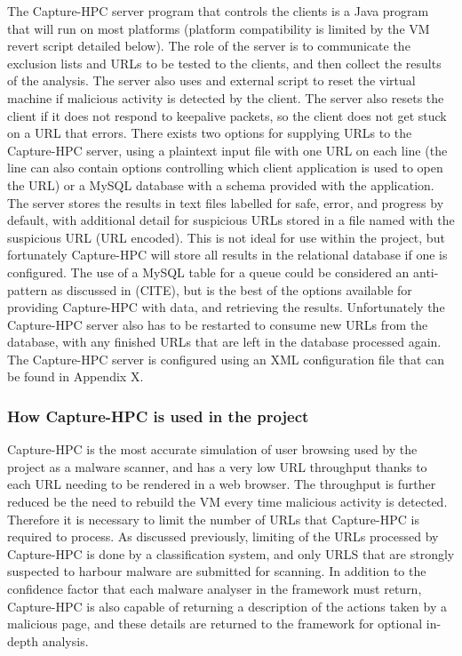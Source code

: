 The Capture-HPC server program that controls the clients is a Java program that
will run on most platforms (platform compatibility is limited by the VM revert
script detailed below). The role of the server is to communicate the exclusion
lists and URLs to be tested to the clients, and then collect the results of the
analysis. The server also uses and external script to reset the virtual machine
if malicious activity is detected by the client. The server also resets the
client if it does not respond to keepalive packets, so the client does not get
stuck on a URL that errors. There exists two options for supplying URLs to the
Capture-HPC server, using a plaintext input file with one URL on each line (the
line can also contain options controlling which client application is used to
open the URL) or a MySQL database with a schema provided with the application.
The server stores the results in text files labelled for safe, error, and
progress by default, with additional detail for suspicious URLs stored in a file
named with the suspicious URL (URL encoded). This is not ideal for use within
the project, but fortunately Capture-HPC will store all results in the
relational database if one is configured. The use of a MySQL table for a queue
could be considered an anti-pattern as discussed in (CITE), but is the best of
the options available for providing Capture-HPC with data, and retrieving the
results. Unfortunately the Capture-HPC server also has to be restarted to
consume new URLs from the database, with any finished URLs that are left in the
database processed again. The Capture-HPC server is configured using an XML
configuration file that can be found in Appendix X.

\subsubsection{How Capture-HPC is used in the project}

Capture-HPC is the most accurate simulation of user browsing used by the project
as a malware scanner, and has a very low URL throughput thanks to each URL
needing to be rendered in a web browser. The throughput is further reduced be
the need to rebuild the VM every time malicious activity is detected. Therefore
it is necessary to limit the number of URLs that Capture-HPC is required to
process. As discussed previously, limiting of the URLs processed by Capture-HPC
is done by a classification system, and only URLS that are strongly suspected to
harbour malware are submitted for scanning. In addition to the confidence factor
that each malware analyser in the framework must return, Capture-HPC is also
capable of returning a description of the actions taken by a malicious page, and
these details are returned to the framework for optional in-depth analysis.

